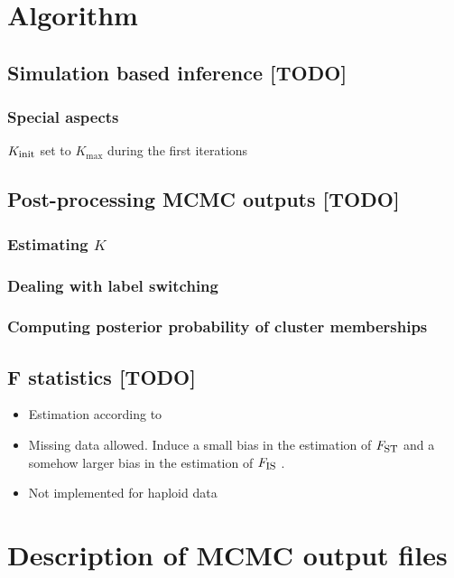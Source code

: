 \documentclass[a4paper,10pt]{article}
\newcommand{\Fst}{F_{\mbox{\footnotesize ST}}}
\newcommand{\Fis}{F_{\mbox{\footnotesize IS}}}
\begin{document}
\clearpage

\section{Algorithm}\label{sec:algo}

\subsection{Simulation based inference [TODO] }

\subsubsection{Special aspects}
$K_{\mbox{\footnotesize init}}$ set to $K_{\max}$ during the first iterations

\subsection{Post-processing MCMC outputs [TODO] }

\subsubsection{Estimating $K$}

\subsubsection{Dealing with label switching} 

\subsubsection{Computing posterior probability of cluster memberships}


\subsection{F statistics [TODO] }

\begin{itemize}
\item Estimation according to \citet{Weir84}
\item Missing data allowed. Induce a small bias in the estimation of $\Fst$ and a somehow larger bias in the estimation of $\Fis$ .
\item Not implemented for haploid data
\end{itemize}

\section{Description of MCMC output files }
\end{document}
